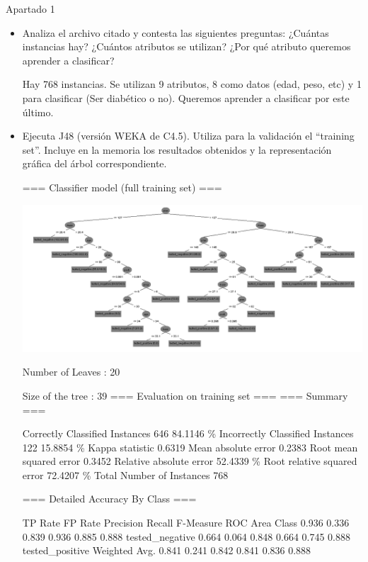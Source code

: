 \documentclass[11pt, a4paper, spanish, openright, twoside]{book}
\begin{document}
\begin{section}{Apartado 1}
	
	\begin{itemize} 
	\item Analiza el archivo citado y contesta las siguientes preguntas: ¿Cuántas instancias hay? ¿Cuántos 
	atributos se utilizan? ¿Por qué atributo queremos aprender a clasificar?

	Hay 768 instancias. Se utilizan 9 atributos, 8 como datos (edad, peso, etc)  y 1 para clasificar (Ser diabético o no). Queremos aprender a clasificar por este último.
 
	\item Ejecuta J48 (versión WEKA de C4.5). Utiliza para la validación el “training set”. Incluye en la 
	memoria los resultados obtenidos y la representación gráfica del árbol correspondiente.


=== Classifier model (full training set) ===

\includegraphics{arbol}

Number of Leaves  : 	20

Size of the tree : 	39
	=== Evaluation on training set ===
	=== Summary ===

Correctly Classified Instances         646               84.1146 \%
Incorrectly Classified Instances       122               15.8854 \%
Kappa statistic                          0.6319
Mean absolute error                      0.2383
Root mean squared error                  0.3452
Relative absolute error                 52.4339 \%
Root relative squared error             72.4207 \%
Total Number of Instances              768     

=== Detailed Accuracy By Class ===

               TP Rate   FP Rate   Precision   Recall  F-Measure   ROC Area  Class
                 0.936     0.336      0.839     0.936     0.885      0.888    tested_negative
                 0.664     0.064      0.848     0.664     0.745      0.888    tested_positive
Weighted Avg.    0.841     0.241      0.842     0.841     0.836      0.888


\end{itemize}
\end{section}
\end{document}
